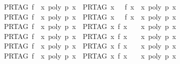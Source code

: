 \begin{isabellebody}
\ \ {\isachardoublequoteopen}PR{\isacharunderscore}TAG\ f\ {\isacharequal}\ {\isacharparenleft}{\isasymlambda}x{\isachardot}\ poly\ p\ x{\isacharparenright}\ {\isasymLongrightarrow}\ PR{\isacharunderscore}TAG\ {\isacharparenleft}{\isasymlambda}x{\isachardot}\ {}\ {\isacharequal}\ f\ x{\isacharparenright}\ {\isacharequal}\ {\isacharparenleft}{\isasymlambda}x{\isachardot}\ poly\ p\ x\ {\isacharequal}\ {}{\isacharparenright}{\isachardoublequoteclose}\isanewline
\ \ {\isachardoublequoteopen}PR{\isacharunderscore}TAG\ f\ {\isacharequal}\ {\isacharparenleft}{\isasymlambda}x{\isachardot}\ poly\ p\ x{\isacharparenright}\ {\isasymLongrightarrow}\ PR{\isacharunderscore}TAG\ {\isacharparenleft}{\isasymlambda}x{\isachardot}\ {}\ {\isasymnoteq}\ f\ x{\isacharparenright}\ {\isacharequal}\ {\isacharparenleft}{\isasymlambda}x{\isachardot}\ poly\ p\ x\ {\isasymnoteq}\ {}{\isacharparenright}{\isachardoublequoteclose}\isanewline
\ \ {\isachardoublequoteopen}PR{\isacharunderscore}TAG\ f\ {\isacharequal}\ {\isacharparenleft}{\isasymlambda}x{\isachardot}\ poly\ p\ x{\isacharparenright}\ {\isasymLongrightarrow}\ PR{\isacharunderscore}TAG\ {\isacharparenleft}{\isasymlambda}x{\isachardot}\ f\ x\ {\isasymge}\ {}{\isacharparenright}\ {\isacharequal}\ {\isacharparenleft}{\isasymlambda}x{\isachardot}\ poly\ p\ x\ {\isasymge}\ {}{\isacharparenright}{\isachardoublequoteclose}\isanewline
\ \ {\isachardoublequoteopen}PR{\isacharunderscore}TAG\ f\ {\isacharequal}\ {\isacharparenleft}{\isasymlambda}x{\isachardot}\ poly\ p\ x{\isacharparenright}\ {\isasymLongrightarrow}\ PR{\isacharunderscore}TAG\ {\isacharparenleft}{\isasymlambda}x{\isachardot}\ f\ x\ {\isachargreater}\ {}{\isacharparenright}\ {\isacharequal}\ {\isacharparenleft}{\isasymlambda}x{\isachardot}\ poly\ p\ x\ {\isachargreater}\ {}{\isacharparenright}{\isachardoublequoteclose}\isanewline
\ \ {\isachardoublequoteopen}PR{\isacharunderscore}TAG\ f\ {\isacharequal}\ {\isacharparenleft}{\isasymlambda}x{\isachardot}\ poly\ p\ x{\isacharparenright}\ {\isasymLongrightarrow}\ PR{\isacharunderscore}TAG\ {\isacharparenleft}{\isasymlambda}x{\isachardot}\ f\ x\ {\isasymle}\ {}{\isacharparenright}\ {\isacharequal}\ {\isacharparenleft}{\isasymlambda}x{\isachardot}\ poly\ {\isacharparenleft}{\isacharminus}p{\isacharparenright}\ x\ {\isasymge}\ {}{\isacharparenright}{\isachardoublequoteclose}\isanewline
\ \ {\isachardoublequoteopen}PR{\isacharunderscore}TAG\ f\ {\isacharequal}\ {\isacharparenleft}{\isasymlambda}x{\isachardot}\ poly\ p\ x{\isacharparenright}\ {\isasymLongrightarrow}\ PR{\isacharunderscore}TAG\ {\isacharparenleft}{\isasymlambda}x{\isachardot}\ f\ x\ {\isacharless}\ {}{\isacharparenright}\ {\isacharequal}\ {\isacharparenleft}{\isasymlambda}x{\isachardot}\ poly\ {\isacharparenleft}{\isacharminus}p{\isacharparenright}\ x\ {\isachargreater}\ {}{\isacharparenright}{\isachardoublequoteclose}\isanewline

\end{isabellebody}
